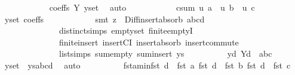 \begin{isabellebody}
\ \ \ \ \ \ \ \ \ \ \isamarkupfalse%
\ coeffs\ Y{\isacharparenleft}{\kern0pt}{}{\isacharparenright}{\kern0pt}\ y{\isacharunderscore}{\kern0pt}set\ \isamarkupfalse%
\ auto\isanewline
\ \ \ \ \ \ \ \ \isamarkupfalse%
\ \isamarkupfalse%
\ c{\isacharunderscore}{\kern0pt}sum{\isacharcolon}{\kern0pt}{\isachardoublequoteopen}\ u\ a\ {\isacharplus}{\kern0pt}\ u\ b\ {\isacharplus}{\kern0pt}\ u\ c\ {\isacharequal}{\kern0pt}\ {}{\isachardoublequoteclose}\ \isamarkupfalse%
\ y{\isacharunderscore}{\kern0pt}set\ coeffs\isanewline
\ \ \ \ \ \ \ \ \ \ \isamarkupfalse%
\ {\isacharparenleft}{\kern0pt}smt\ {\isacharparenleft}{\kern0pt}z{}{\isacharparenright}{\kern0pt}\ {\isachardoublequoteopen}{}{}{\isachardoublequoteclose}\ Diff{\isacharunderscore}{\kern0pt}insert{\isacharunderscore}{\kern0pt}absorb\ abcd\isanewline
\ \ \ \ \ \ \ \ \ \ \ \ \ \ distinct{\isachardot}{\kern0pt}simps{\isacharparenleft}{\kern0pt}{}{\isacharparenright}{\kern0pt}\ empty{\isacharunderscore}{\kern0pt}set\ finite{\isachardot}{\kern0pt}emptyI\isanewline
\ \ \ \ \ \ \ \ \ \ \ \ \ \ finite{\isacharunderscore}{\kern0pt}insert\ insertCI\ insert{\isacharunderscore}{\kern0pt}absorb\ insert{\isacharunderscore}{\kern0pt}commute\isanewline
\ \ \ \ \ \ \ \ \ \ \ \ \ \ list{\isachardot}{\kern0pt}simps{\isacharparenleft}{\kern0pt}{}{}{\isacharparenright}{\kern0pt}\ sum{\isachardot}{\kern0pt}empty\ sum{\isachardot}{\kern0pt}insert\ ys{\isacharparenright}{\kern0pt}\isanewline
\ \ \ \ \ \ \ \ \isamarkupfalse%
\ y{\isacharunderscore}{\kern0pt}d{\isacharcolon}{\kern0pt}\ {\isachardoublequoteopen}Y{\isacharminus}{\kern0pt}{\isacharbraceleft}{\kern0pt}d{\isacharbraceright}{\kern0pt}\ {\isacharequal}{\kern0pt}\ {\isacharbraceleft}{\kern0pt}a{\isacharcomma}{\kern0pt}b{\isacharcomma}{\kern0pt}c{\isacharbraceright}{\kern0pt}{\isachardoublequoteclose}\ \isamarkupfalse%
\ y{\isacharunderscore}{\kern0pt}set\ {\isachardoublequoteopen}{}{}{\isachardoublequoteclose}\ ys{\isacharunderscore}{\kern0pt}abcd\ \isamarkupfalse%
\ auto\isanewline
\ \ \ \ \ \ \ \ \isamarkupfalse%
\ fst{\isacharunderscore}{\kern0pt}a{\isacharunderscore}{\kern0pt}min{\isacharcolon}{\kern0pt}{\isachardoublequoteopen}fst\ d\ {\isachargreater}{\kern0pt}\ fst\ a{\isachardoublequoteclose}\ {\isachardoublequoteopen}fst\ d\ {\isachargreater}{\kern0pt}\ fst\ b{\isachardoublequoteclose}\ {\isachardoublequoteopen}fst\ d\ {\isachargreater}{\kern0pt}\ fst\ c{\isachardoublequoteclose}\ \isamarkupfalse%

\end{isabellebody}
